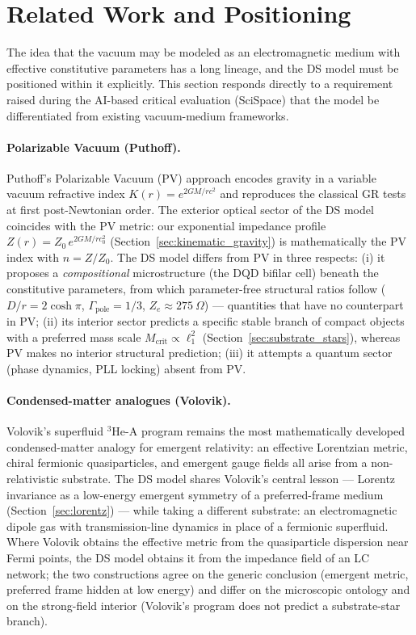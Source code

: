 \documentclass[11pt,a4paper]{article}
\theoremstyle{plain}
\theoremstyle{remark}
\begin{document}
\section{Related Work and Positioning}
\label{sec:related_work}

The idea that the vacuum may be modeled as an electromagnetic medium with effective constitutive parameters has a long lineage, and the DS model must be positioned within it explicitly. This section responds directly to a requirement raised during the AI-based critical evaluation (SciSpace) that the model be differentiated from existing vacuum-medium frameworks.

\paragraph{Polarizable Vacuum (Puthoff).} Puthoff's Polarizable Vacuum (PV) approach \cite{puthoff2002} encodes gravity in a variable vacuum refractive index $K(r) = e^{2GM/rc^2}$ and reproduces the classical GR tests at first post-Newtonian order. The exterior optical sector of the DS model coincides with the PV metric: our exponential impedance profile $Z(r) = Z_0\,e^{2GM/rc_0^2}$ (Section~\ref{sec:kinematic_gravity}) is mathematically the PV index with $n = Z/Z_0$. The DS model differs from PV in three respects: (i) it proposes a \emph{compositional} microstructure (the DQD bifilar cell) beneath the constitutive parameters, from which parameter-free structural ratios follow ($D/r = 2\cosh\pi$, $\Gamma_{\text{pole}} = 1/3$, $Z_e \approx 275~\Omega$) --- quantities that have no counterpart in PV; (ii) its interior sector predicts a specific stable branch of compact objects with a preferred mass scale $M_{\text{crit}} \propto \ell_1^2$ (Section~\ref{sec:substrate_stars}), whereas PV makes no interior structural prediction; (iii) it attempts a quantum sector (phase dynamics, PLL locking) absent from PV.

\paragraph{Condensed-matter analogues (Volovik).} Volovik's superfluid $^3$He-A program \cite{volovik} remains the most mathematically developed condensed-matter analogy for emergent relativity: an effective Lorentzian metric, chiral fermionic quasiparticles, and emergent gauge fields all arise from a non-relativistic substrate. The DS model shares Volovik's central lesson --- Lorentz invariance as a low-energy emergent symmetry of a preferred-frame medium (Section~\ref{sec:lorentz}) --- while taking a different substrate: an electromagnetic dipole gas with transmission-line dynamics in place of a fermionic superfluid. Where Volovik obtains the effective metric from the quasiparticle dispersion near Fermi points, the DS model obtains it from the impedance field of an LC network; the two constructions agree on the generic conclusion (emergent metric, preferred frame hidden at low energy) and differ on the microscopic ontology and on the strong-field interior (Volovik's program does not predict a substrate-star branch).
\end{document}

